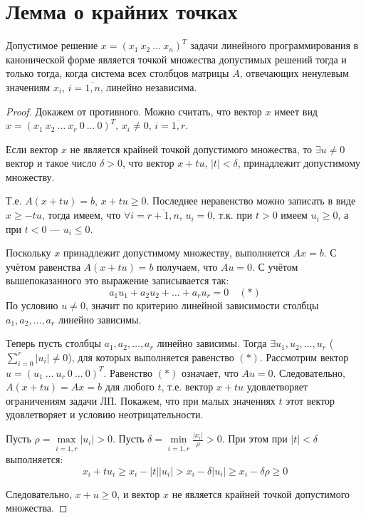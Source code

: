\documentclass[17pt]{extarticle}
\begin{document}
\section{Лемма о крайних точках}

\begin{lemma}
    Допустимое решение \( x = (x_1 \ x_2 \ \dots \ x_n)^T \) задачи линейного программирования в канонической форме
    является точкой множества допустимых решений тогда и только тогда, когда система всех столбцов матрицы \( A \),
    отвечающих ненулевым значениям \( x_i \), \( i = \overline{1,n} \), линейно независима.
\end{lemma}

\begin{proof}
    Докажем от противного. Можно считать, что вектор \( x \) имеет вид
    \( x = (x_1 \ x_2 \ \dots \ x_r \ 0 \ \dots \ 0)^T \), \( x_i \ne 0 \), \( i = \overline{1,r} \).

    Если вектор \( x \) не является крайней точкой допустимого множества,
    то \( \exists u \ne 0 \) вектор и такое число \( \delta > 0 \), что вектор \( x + tu \), \( |t| < \delta \),
    принадлежит допустимому множеству.

    Т.е. \( A(x + tu) = b \), \( x + tu \ge 0 \). Последнее неравенство можно записать в виде \( x \ge -tu \),
    тогда имеем, что \( \forall i = \overline{r+1, n} \), \( u_i = 0 \), т.к. при \( t > 0 \) имеем \( u_i \ge 0 \),
    а при \( t < 0 \) — \( u_i \le 0 \).

    Поскольку \( x \) принадлежит допустимому множеству, выполняется \( Ax = b \).
    С учётом равенства \( A(x + tu) = b \) получаем, что \( Au = 0 \). С учётом вышепоказанного это выражение записывается так:
    \[
        a_1u_1 + a_2u_2 + \dots + a_ru_r = 0 \quad (*)
    \]
    По условию \( u \ne 0 \), значит по критерию линейной зависимости столбцы \( a_1, a_2, \dots, a_r \) линейно зависимы.

    Теперь пусть столбцы \( a_1, a_2, \dots, a_r \) линейно зависимы.
    Тогда \( \exists u_1, u_2, \dots, u_r \) (\( \sum\limits_{i=0}^r |u_i| \ne 0 \)),
    для которых выполняется равенство \( (*) \). Рассмотрим вектор \( u = (u_1 \ \dots \ u_r \ 0 \ \dots \ 0)^T \).
    Равенство \( (*) \) означает, что \( Au = 0 \). Следовательно, \( A(x + tu) = Ax = b \) для любого \( t \),
    т.е. вектор \( x + tu \) удовлетворяет ограничениям задачи ЛП.
    Покажем, что при малых значениях \( t \) этот вектор удовлетворяет и условию неотрицательности.

    Пусть \( \rho = \max\limits_{i = \overline{1,r}} |u_i| > 0 \). Пусть \( \delta = \min\limits_{i = \overline{1,r}} \frac{|x_i|}{\rho} > 0 \).
    При этом при \( |t| < \delta \) выполняется:
    \[
        x_i + tu_i \ge x_i - |t||u_i| > x_i - \delta|u_i| \ge x_i - \delta\rho \ge 0
    \]

    Следовательно, \( x + u \ge 0 \), и вектор \( x \) не является крайней точкой допустимого множества.
\end{proof}
\end{document}
